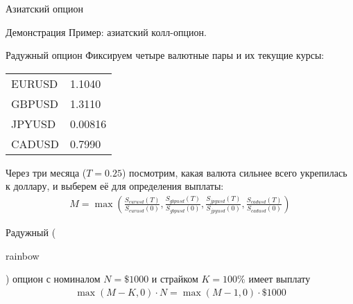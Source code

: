 \documentclass{beamer}
\newcommand{\en}[1]{\begin{otherlanguage}{english}#1\end{otherlanguage}}
\begin{document}
\newcommand{\plotStockPath}[2] {
	
	\addplot[
		mark = *,
		color = #2,
		thick
	]
	table[
		x = t,
		y = stock_price,
		col sep = comma,
		discard if not={path}{#1}
	]
	{monte_carlo_paths.csv};
}

\begin{frame}{Азиатский опцион}
\centering
{}
\end{frame}



\begin{frame}{Демонстрация}
\justify
Пример: азиатский колл-опцион.
\end{frame}



\begin{frame}{Радужный опцион}
\justify
Фиксируем четыре валютные пары и их текущие курсы:

\centering
\begin{tabular}{l|l}
EURUSD & 1.1040 \\
GBPUSD & 1.3110 \\
JPYUSD & 0.00816 \\
CADUSD & 0.7990
\end{tabular}

\justify
Через три месяца ($T=0.25$) посмотрим, какая валюта сильнее всего укрепилась к доллару, и выберем её для определения выплаты:
\begin{align*}
M = \max\left(\frac{S_{eurusd}(T)}{S_{eurusd}(0)}, \frac{S_{gbpusd}(T)}{S_{gbpusd}(0)}, \frac{S_{jpyusd}(T)}{S_{jpyusd}(0)}, \frac{S_{cadusd}(T)}{S_{cadusd}(0)} \right)
\end{align*}

\justify 
Радужный (\en{rainbow}) опцион с номиналом $N=\$1000$ и страйком $K=100\%$ имеет выплату
\begin{align*}
\max(M - K, 0) \cdot N = \max(M-1, 0) \cdot \$1000
\end{align*}
\end{frame}
\end{document}
